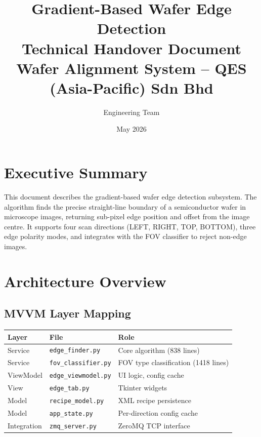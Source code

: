 \documentclass[11pt,a4paper]{article}
\title{\textbf{Gradient-Based Wafer Edge Detection}\\[4pt]\large Technical Handover Document\\[2pt]\normalsize Wafer Alignment System -- QES (Asia-Pacific) Sdn Bhd}
\author{Engineering Team}\date{May 2026}
\begin{document}
\maketitle\tableofcontents\newpage

\section{Executive Summary}
This document describes the gradient-based wafer edge detection subsystem. The algorithm finds the precise straight-line boundary of a semiconductor wafer in microscope images, returning sub-pixel edge position and offset from the image centre. It supports four scan directions (LEFT, RIGHT, TOP, BOTTOM), three edge polarity modes, and integrates with the FOV classifier to reject non-edge images.

\section{Architecture Overview}

\subsection{MVVM Layer Mapping}
\begin{center}
\begin{tabular}{lll}\toprule
\textbf{Layer} & \textbf{File} & \textbf{Role}\\\midrule
Service & \texttt{edge\_finder.py} & Core algorithm (838 lines)\\
Service & \texttt{fov\_classifier.py} & FOV type classification (1418 lines)\\
ViewModel & \texttt{edge\_viewmodel.py} & UI logic, config cache\\
View & \texttt{edge\_tab.py} & Tkinter widgets\\
Model & \texttt{recipe\_model.py} & XML recipe persistence\\
Model & \texttt{app\_state.py} & Per-direction config cache\\
Integration & \texttt{zmq\_server.py} & ZeroMQ TCP interface\\\bottomrule
\end{tabular}
\end{center}
\end{document}

